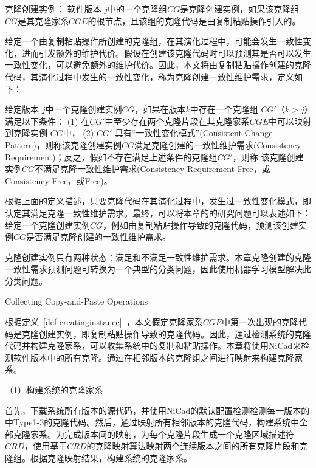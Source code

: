 \begin{definition}[克隆创建实例] 
\label{def-creatinginstance}
克隆创建实例：
软件版本 $j$中的一个克隆组$CG$是克隆创建实例，如果该克隆组$CG$是其克隆家系$CGE$的根节点，且该组的克隆代码是由复制粘贴操作引入的。
\end{definition}

给定一个由复制粘贴操作所创建的克隆组，在其演化过程中，可能会发生一致性变化，进而引发额外的维护代价。假设在创建该克隆代码时可以预测其是否可以发生一致性变化，可以避免额外的维护代价。因此，本文将由复制粘贴操作创建的克隆代码，其演化过程中发生的一致性变化，称为克隆创建一致性维护需求，定义如下：

\begin{definition}[克隆创建时一致性维护需求] 
 \label{def-creatingrequirement}
给定版本 $j$中一个克隆创建实例$CG$，如果在版本$k$中存在一个克隆组 $CG'$（$k>j$）满足以下条件： (1) 在$CG'$中至少存在两个克隆片段在其克隆家系$CGE$中可以映射到克隆实例 $CG$中， (2) $CG'$ 具有“一致性变化模式”(Consistent Change Pattern)，则称该克隆创建实例$CG$满足克隆创建的一致性维护需求(Consistency-Requirement)；反之，假如不存在满足上述条件的克隆组$CG'$，则称 该克隆创建实例$CG$不满足克隆一致性维护需求(Consistency-Requirement Free，或Consistency-Free，或Free)。
\end{definition}

根据上面的定义描述，只要克隆代码在其演化过程中，发生过一致性变化模式，即认定其满足克隆一致性维护需求。最终，可以将本章的的研究问题可以表述如下：给定一个克隆创建实例$CG$，例如由复制粘贴操作导致的克隆代码，预测该创建实例$CG$是否满足克隆创建的一致性维护需求。

克隆创建实例只有两种状态：满足和不满足一致性维护需求。本章克隆创建的克隆一致性需求预测问题可转换为一个典型的分类问题，因此使用机器学习模型解决此分类问题。

{Collecting Copy-and-Paste Operations}
\label{lab-checkcopied}

根据定义~\ref{def-creatinginstance}~，本文假定克隆家系$CGE$中第一次出现的克隆代码是克隆创建实例，即复制粘贴操作导致的克隆代码。因此，通过检测系统的克隆代码并构建克隆家系，可以收集系统中的复制和粘贴操作。本章将使用NiCad来检测软件版本中的所有克隆。通过在相邻版本的克隆组之间进行映射来构建克隆家系。

（1）构建系统的克隆家系

首先，下载系统所有版本的源代码，并使用NiCad的默认配置检测检测每一版本的中Type1-3的克隆代码。然后，通过映射所有相邻版本的克隆代码，构建系统中全部克隆家系。为完成版本间的映射，为每个克隆片段生成一个克隆区域描述符 $CRD$\cite{duala2010clone}，使用基于$CRD$的克隆映射算法映射两个连续版本之间的所有克隆片段和克隆组\cite{ci2013new,ci2013newD}。根据克隆映射结果，构建系统的克隆家系。


